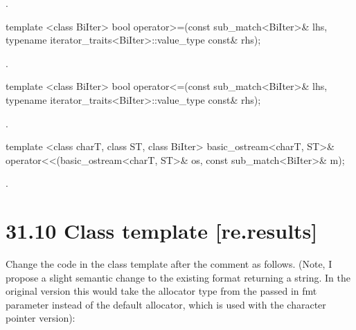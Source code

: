 \documentclass[ebook,11pt,article]{memoir}
\begin{document}
\begin{itemdescr}
\pnum
\returns {}.
\end{itemdescr}

\begin{itemdecl}
template <class BiIter> 
  bool operator>=(const sub_match<BiIter>& lhs, 
                  typename iterator_traits<BiIter>::value_type const& rhs); 
\end{itemdecl}

\begin{itemdescr}
\pnum
\returns {}.
\end{itemdescr}

\begin{itemdecl}
template <class BiIter> 
  bool operator<=(const sub_match<BiIter>& lhs, 
                  typename iterator_traits<BiIter>::value_type const& rhs); 
\end{itemdecl}

\begin{itemdescr}
\pnum
\returns {}.
\end{itemdescr}

\begin{itemdecl}
template <class charT, class ST, class BiIter>
  basic_ostream<charT, ST>&
  operator<<(basic_ostream<charT, ST>& os, const sub_match<BiIter>& m); 
\end{itemdecl}

\begin{itemdescr}
\pnum\returns  {}.
\end{itemdescr}

\section{31.10 Class template  [re.results]}
Change the code in the class template after the comment  as follows. (Note, I propose a slight semantic change to the existing format returning a string. In the original version this would take the allocator type from the passed in fmt parameter instead of the default allocator, which is used with the character pointer version):
\end{document}
